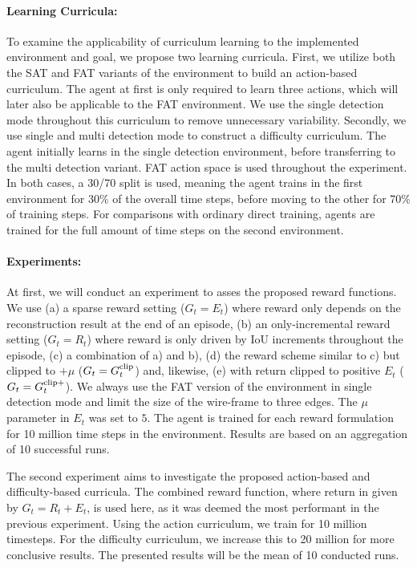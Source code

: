 \documentclass[11pt]{article} %
\begin{document}
\paragraph{Learning Curricula:}
\label{sec:curricula}
To examine the applicability of curriculum learning to the implemented environment and goal, we propose two learning curricula. 
First, we utilize both the SAT and FAT variants of the environment to build an action-based curriculum.
The agent at first is only required to learn three actions, which will later also be applicable to the FAT environment. 
We use the single detection mode throughout this curriculum to remove unnecessary variability. 
Secondly, we use single and multi detection mode to construct a difficulty curriculum.
The agent initially learns in the single detection environment, before transferring to the multi detection variant.
FAT action space is used throughout the experiment.
In both cases, a 30/70 split is used, meaning the agent trains in the first environment for 30\% of the overall time steps, before moving to the other for 70\% of training steps.
For comparisons with ordinary direct training, agents are trained for the full amount of time steps on the second environment.

\paragraph{Experiments:}
\label{sec:experiment}

At first, we will conduct an experiment to asses the proposed reward functions. We use (a) a sparse reward setting ($G_t=E_t$) where reward only depends on the reconstruction result at the end of an episode, (b) an only-incremental reward setting ($G_t=R_t$) where reward is only driven by IoU increments throughout the episode, (c) a combination of a) and b), (d) the reward scheme similar to c) but clipped to $+\mu$ ($G_t=G_t^\textnormal{clip}$) and, likewise, (e) with return clipped to positive $E_t$ ($G_t=G_t^\textnormal{clip+}$). We always use the FAT version of the environment in single detection mode and limit the size of the wire-frame to three edges. The $\mu$ parameter in $E_t$ was set to $5$. The agent is trained for each reward formulation for 10 million time steps in the environment.
Results are based on an aggregation of 10 successful runs.

The second experiment aims to investigate the proposed action-based and difficulty-based curricula. The combined reward function, where return in given by $G_t = R_t + E_t$, is used here, as it was deemed the most performant in the previous experiment.
Using the action curriculum, we train for 10 million timesteps. For the difficulty curriculum, we increase this to 20 million for more conclusive results.
The presented results will be the mean of 10 conducted runs.
\end{document}
